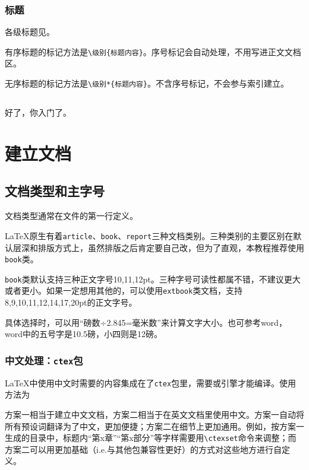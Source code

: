 \documentclass[10pt,openany]{book}
\begin{document}
\begin{sloppypar}
\subsection{标题}

各级标题见\textit{}。

有序标题的标记方法是\texttt{\textbackslash{}级别\{标题内容\}}。序号标记会自动处理，不用写进正文文档区。

无序标题的标记方法是\texttt{\textbackslash{}级别*\{标题内容\}}。不含序号标记，不会参与索引建立。

\section*{}

好了，你入门了。

\chapter{建立文档}

\section{文档类型和主字号}

文档类型通常在文件的第一行定义。



{\LaTeX}原生有着\texttt{article}、\texttt{book}、\texttt{report}三种文档类别。三种类别的主要区别在默认层深和排版方式上，虽然排版之后肯定要自己改，但为了直观，本教程推荐使用\texttt{book}类。

\texttt{book}类默认支持三种正文字号10,11,12pt。三种字号可读性都属不错，不建议更大或者更小。如果一定想用其他的，可以使用\texttt{extbook}类文档，支持8,9,10,11,12,14,17,20pt的正文字号。

具体选择时，可以用“磅数÷2.845=毫米数”来计算文字大小。也可参考word，word中的五号字是10.5磅，小四则是12磅。

\subsection{中文处理：\texttt{ctex}包}

{\LaTeX}中使用中文时需要的内容集成在了\texttt{ctex}包里，需要{\XeLaTeX}或{\LuaLaTeX}引擎才能编译。使用方法为



方案一相当于建立中文文档，方案二相当于在英文文档里使用中文。方案一自动将所有预设词翻译为了中文，更加便捷；方案二在细节上更加通用。例如，按方案一生成的目录中，标题内“第x章”“第x部分”等字样需要用\texttt{\textbackslash{}ctexset}命令来调整；而方案二可以用更加基础（i.e.与其他包兼容性更好）的方式对这些地方进行自定义。


\end{sloppypar}
\end{document}

